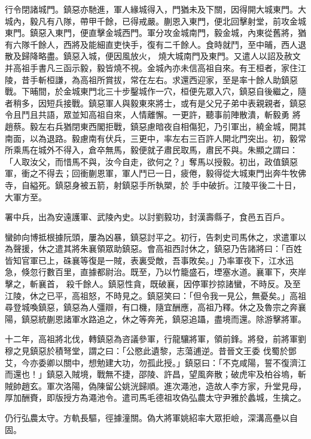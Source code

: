 \begin{pinyinscope}
 行令閉諸城門。鎮惡亦馳進，軍人緣城得入，門猶未及下關，因得開大城東門。大城內，毅凡有八隊，帶甲千餘，已得戒嚴。蒯恩入東門，便北回擊射堂，前攻金城東門。鎮惡入東門，便直擊金城西門。軍分攻金城南門，毅金城，內東從舊將，猶有六隊千餘人，西將及能細直吏快手，復有二千餘人。食時就鬥，至中晡，西人退散及歸降略盡。鎮惡入城，便因風放火，
 燒大城南門及東門。又遣人以詔及赦文并高祖手書凡三函示毅，毅皆燒不視。金城內亦未信高祖自來。有王桓者，家住江陵，昔手斬桓謙，為高祖所賞拔，常在左右。求還西迎家，至是率十餘人助鎮惡戰。下晡間，於金城東門北三十步鑿城作一穴，桓便先眾入穴，鎮惡自後繼之，隨者稍多，因短兵接戰。鎮惡軍人與毅東來將士，或有是父兄子弟中表親親者，鎮惡令且鬥且共語，眾並知高祖自來，人情離懈。一更許，聽事前陣散潰，斬毅勇
 將趙蔡。毅左右兵猶閉東西閣拒戰，鎮惡慮暗夜自相傷犯，乃引軍出，繞金城，開其南面，以為退路。毅慮南有伏兵，三更中，率左右三百許人開北門突出。初，毅常所乘馬在城外不得入，倉卒無馬，毅便就子肅民取馬，肅民不與。朱顯之謂曰：「人取汝父，而惜馬不與，汝今自走，欲何之？」奪馬以授毅。初出，政值鎮惡軍，衝之不得去；回衝蒯恩軍，軍人鬥已一日，疲倦，毅得從大城東門出奔牛牧佛寺，自縊死。鎮惡身被五箭，射鎮惡手所執槊，於
 手中破折。江陵平後二十日，大軍方至。



 署中兵，出為安遠護軍、武陵內史。以討劉毅功，封漢壽縣子，食邑五百戶。



 蠻帥向博抵根據阮頭，屢為凶暴，鎮惡討平之。初行，告刺史司馬休之，求遣軍以為聲援，休之遣其將朱襄領眾助鎮惡。會高祖西討休之，鎮惡乃告諸將曰：「百姓皆知官軍已上，硃襄等復是一賊，表裏受敵，吾事敗矣。」乃率軍夜下，江水迅急，倏忽行數百里，直據都尉治。既至，乃以竹籠盛石，堙塞水道。襄軍下，夾岸擊之，斬襄首，
 殺千餘人。鎮惡性貪，既破襄，因停軍抄掠諸蠻，不時反。及至江陵，休之已平，高祖怒，不時見之。鎮惡笑曰：「但令我一見公，無憂矣。」高祖尋登城喚鎮惡，鎮惡為人彊辯，有口機，隨宜酬應，高祖乃釋。休之及魯宗之奔襄陽，鎮惡統蒯恩諸軍水路追之，休之等奔羌，鎮惡追躡，盡境而還。除游擊將軍。



 十二年，高祖將北伐，轉鎮惡為咨議參軍，行龍驤將軍，領前鋒。將發，前將軍劉穆之見鎮惡於積弩堂，謂之曰：「公愍此遺黎，志蕩逋逆。昔晉文王委
 伐蜀於鄧艾，今亦委卿以關中，想勉建大功，勿孤此授。」鎮惡曰：「不克咸陽，誓不復濟江而還也！」鎮惡入賊境，戰無不捷，邵陵、許昌，望風奔散；破虎牢及柏谷塢，斬賊帥趙玄。軍次洛陽，偽陳留公姚洸歸順。進次澠池，造故人李方家，升堂見母，厚加酬賚，即版授方為澠池令。遣司馬毛德祖攻偽弘農太守尹雅於蠡城，生擒之。



 仍行弘農太守。方軌長驅，徑據潼關。偽大將軍姚紹率大眾拒嶮，深溝高壘以自固。




\end{pinyinscope}

